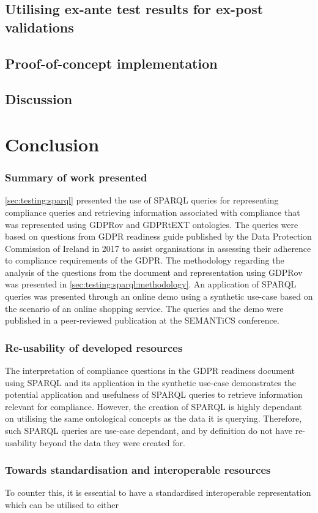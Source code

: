\subsection{Utilising ex-ante test results for ex-post validations}\label{sec:testing:shacl:combine}

\subsection{Proof-of-concept implementation}\label{sec:testing:shacl:demo}

\subsection{Discussion}\label{sec:testing:shacl:eval}

\section{Conclusion}\label{sec:sparql:conclusion}


\subsubsection{Summary of work presented}
\autoref{sec:testing:sparql} presented the use of SPARQL queries for representing compliance queries and retrieving information associated with compliance that was represented using GDPRov and GDPRtEXT ontologies.
The queries were based on questions from GDPR readiness guide published by the Data Protection Commission of Ireland in 2017 to assist organisations in assessing their adherence to compliance requirements of the GDPR.
The methodology regarding the analysis of the questions from the document and representation using GDPRov was presented in \autoref{sec:testing:sparql:methodology}.
An application of SPARQL queries was presented through an online demo using a synthetic use-case based on the scenario of an online shopping service.
The queries and the demo were published in a peer-reviewed publication \cite{pandit_queryable_2018} at the SEMANTiCS conference.

\subsubsection{Re-usability of developed resources}
The interpretation of compliance questions in the GDPR readiness document using SPARQL and its application in the synthetic use-case demonstrates the potential application and usefulness of SPARQL queries to retrieve information relevant for compliance.
However, the creation of SPARQL is highly dependant on utilising the same ontological concepts as the data it is querying. Therefore, such SPARQL queries are use-case dependant, and by definition do not have re-usability beyond the data they were created for.

\subsubsection{Towards standardisation and interoperable resources}
To counter this, it is essential to have a standardised interoperable representation which can be utilised to either 